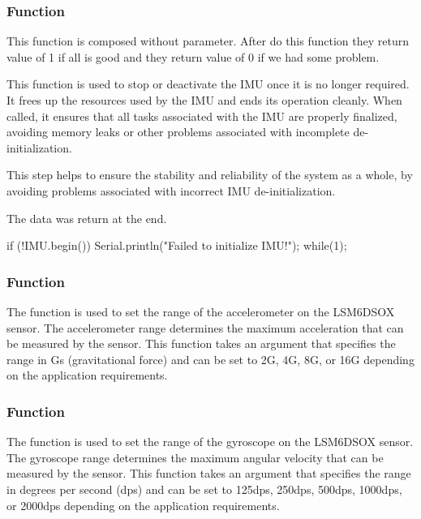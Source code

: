 \subsubsection{Function } 

This function is composed without parameter. After do this function they return value of 1 if all is good and they return value of 0 if we had some problem.

This function is used to stop or deactivate the IMU once it is no longer required. It frees up the resources used by the IMU and ends its operation cleanly. When called, it ensures that all tasks associated with the IMU are properly finalized, avoiding memory leaks or other problems associated with incomplete de-initialization.

This step helps to ensure the stability and reliability of the system as a whole, by avoiding problems associated with incorrect IMU de-initialization.

The data was return at the end. 

\begin{Arduino}
	if (!IMU.begin()) {
		Serial.println("Failed to initialize IMU!");
		while(1){}; }
\end{Arduino}


\subsubsection{Function }

The function is used to set the range of the accelerometer on the LSM6DSOX sensor. The accelerometer range determines the maximum acceleration that can be measured by the sensor. This function takes an argument that specifies the range in Gs (gravitational force) and can be set to 2G, 4G, 8G, or 16G depending on the application requirements.

\subsubsection{Function }

The function is used to set the range of the gyroscope on the LSM6DSOX sensor. The gyroscope range determines the maximum angular velocity that can be measured by the sensor. This function takes an argument that specifies the range in degrees per second (dps) and can be set to 125dps, 250dps, 500dps, 1000dps, or 2000dps depending on the application requirements.

